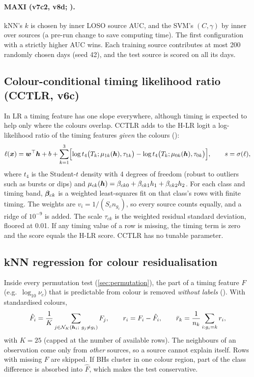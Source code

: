 \paragraph{MAXI (v7c2, v8d; ).} kNN's $k$ is chosen by inner LOSO source AUC, and the SVM's $(C,\gamma)$
by inner  over sources (a pre-run change to save computing time). The first configuration with a strictly
higher AUC wins. Each training source contributes at most 200 randomly chosen days (seed 42), and the test source is scored
on all its days.

\subsection{Colour-conditional timing likelihood ratio (CCTLR, v6c)}\label{sec:cctlr}
In LR a timing feature has one slope everywhere, although timing is expected to help only where the colours overlap.
CCTLR adds to the H-LR logit a log-likelihood ratio of the timing features \emph{given} the colours ():
\begin{equation}
\ell(\bm{x})=\bm{w}^\top\bm{h}+b+\sum_{k=1}^3\Bigl[\log t_4\bigl(T_k;\mu_{1k}(\bm{h}),\tau_{1k}\bigr)-\log t_4\bigl(T_k;\mu_{0k}(\bm{h}),\tau_{0k}\bigr)\Bigr],\qquad s=\sigma(\ell),\label{eq:cctlr}
\end{equation}
where $t_4$ is the Student-$t$ density with 4 degrees of freedom (robust to outliers such as bursts or dips) and
$\mu_{ck}(\bm{h})=\beta_{ck0}+\beta_{ck1}h_1+\beta_{ck2}h_2$. For each class and timing band, $\bm{\beta}_{ck}$ is a weighted
least-squares fit on that class's rows with finite timing. The weights are $v_i=1/(S_cn_{g_i})$, so every source counts
equally, and a ridge of $10^{-9}$ is added. The scale $\tau_{ck}$ is the weighted residual standard deviation, floored at
0.01. If any timing value of a row is missing, the timing term is zero and the score equals the H-LR score. CCTLR has no
tunable parameter.

\subsection{kNN regression for colour residualisation}\label{sec:knnreg}
Inside every permutation test (\cref{sec:permutation}), the part of a timing feature $F$ (e.g.\ $\log_{10}\nu_c$) that is
predictable from colour is removed \emph{without labels} (). With standardised colours,
\begin{equation}
\hat F_i=\frac1K\sum_{j\in\mathcal N_K(\bm{h}_i;\ g_j\ne g_i)}F_j,\qquad r_i=F_i-\hat F_i,\qquad
\bar r_k=\frac1{n_k}\sum_{i:g_i=k}r_i,\label{eq:knnreg}
\end{equation}
with $K=25$ (capped at the number of available rows). The neighbours of an observation come only from \emph{other} sources,
so a source cannot explain itself. Rows with missing $F$ are skipped. If BHs cluster in one colour region, part of the class
difference is absorbed into $\hat F$, which makes the test conservative.

